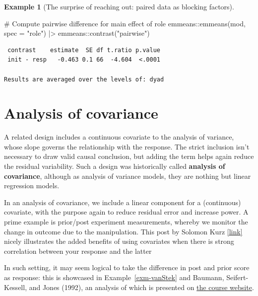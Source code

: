 \documentclass[
  11pt,
  letterpaper,
]{scrbook}
\newenvironment{Shaded}{\begin{snugshade}}{\end{snugshade}}
\newcommand{\AttributeTok}[1]{\textcolor[rgb]{0.40,0.45,0.13}{#1}}
\newcommand{\CommentTok}[1]{\textcolor[rgb]{0.37,0.37,0.37}{#1}}
\newcommand{\FunctionTok}[1]{\textcolor[rgb]{0.28,0.35,0.67}{#1}}
\newcommand{\NormalTok}[1]{\textcolor[rgb]{0.00,0.23,0.31}{#1}}
\newcommand{\SpecialCharTok}[1]{\textcolor[rgb]{0.37,0.37,0.37}{#1}}
\newcommand{\StringTok}[1]{\textcolor[rgb]{0.13,0.47,0.30}{#1}}
\theoremstyle{definition}
\newtheorem{example}{Example}[chapter]
\theoremstyle{remark}
\begin{document}
\begin{example}[The surprise of reaching out: paired data as blocking
factors]
\begin{Shaded}
\begin{Highlighting}[]
\CommentTok{\# Compute pairwise difference for main effect of \textquotesingle{}role\textquotesingle{}}
\NormalTok{emmeans}\SpecialCharTok{::}\FunctionTok{emmeans}\NormalTok{(mod, }\AttributeTok{spec =} \StringTok{"role"}\NormalTok{) }\SpecialCharTok{|\textgreater{}}
\NormalTok{  emmeans}\SpecialCharTok{::}\FunctionTok{contrast}\NormalTok{(}\StringTok{"pairwise"}\NormalTok{)}
\end{Highlighting}
\end{Shaded}

\begin{verbatim}
 contrast    estimate  SE df t.ratio p.value
 init - resp   -0.463 0.1 66  -4.604  <.0001

Results are averaged over the levels of: dyad 
\end{verbatim}

\end{example}

\hypertarget{ancova}{%
\section{Analysis of covariance}\label{ancova}}

A related design includes a continuous covariate to the analysis of
variance, whose slope governs the relationship with the response. The
strict inclusion isn't necessary to draw valid causal conclusion, but
adding the term helps again reduce the residual variability. Such a
design was historically called \textbf{analysis of covariance}, although
as analysis of variance models, they are nothing but linear regression
models.

In an analysis of covariance, we include a linear component for a
(continuous) covariate, with the purpose again to reduce residual error
and increase power. A prime example is prior/post experiment
measurements, whereby we monitor the change in outcome due to the
manipulation. This post by Solomon Kurz
\href{https://solomonkurz.netlify.app/blog/2023-04-12-boost-your-power-with-baseline-covariates/}{{[}link{]}}
nicely illustrates the added benefits of using covariates when there is
strong correlation between your response and the latter

In such setting, it may seem logical to take the difference in post and
prior score as response: this is showcased in Example~\ref{exm-vanStek}
and Baumann, Seifert-Kessell, and Jones (1992), an analysis of which is
presented on \href{https://edsm.rbind.io/example/06-ancova/}{the course
website}.
\end{document}
